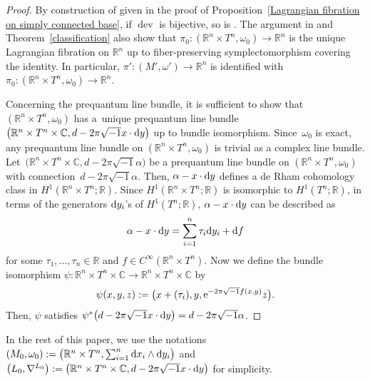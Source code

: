\documentclass[10pt,a4paper]{amsart}
\numberwithin{equation}{section}
\newcommand{\C}{\mathbb{C}}
\newcommand{\R}{\mathbb{R}}
\renewcommand{\tilde}{\widetilde}
\def\dev{\operatorname{dev}}
\begin{document}
\begin{proof}
By construction of \smash{$\tilde \dev$} given in the proof of Proposition~\ref{Lagrangian fibration on simply connected base}, if $\dev$ is bijective, so is \smash{$\tilde \dev$}. The argument in \cite[p.\ 696]{Du} and Theorem~\ref{classification} also show that $\pi_0\colon (\R^n\times T^n,\omega_0)\to \R^n$ is the unique Lagrangian fibration on $\R^n$ up to fiber-preserving symplectomorphism covering the identity. In particular, $\pi'\colon (M',\omega')\to \R^n$ is identified with $\pi_0\colon (\R^n\times T^n,\omega_0)\to \R^n$.

Concerning the prequantum line bundle, it is sufficient to show that $(\R^n\times T^n,\omega_0)$ has a~unique prequantum line bundle $\bigl(\R^n\times T^n\times \C , d-2\pi\sqrt{-1}x\cdot {\rm d}y\bigr)$ up to bundle isomorphism. Since~$\omega_0$ is exact, any prequantum line bundle on $(\R^n\times T^n,\omega_0)$ is trivial as a complex line bundle. Let~${\bigl(\R^n\times T^n\times \C ,d-2\pi\sqrt{-1}\alpha\bigr)}$ be a prequantum line bundle on $(\R^n\times T^n,\omega_0)$ with connection~${d-2\pi\sqrt{-1}\alpha}$. Then, $\alpha-x\cdot {\rm d}y$ defines a de Rham cohomology class in $H^1(\R^n\times T^n; \R)$. Since $H^1(\R^n\times T^n; \R)$ is isomorphic to $H^1(T^n;\R)$, in terms of the generators ${\rm d}y_i$'s of $H^1(T^n;\R)$, $\alpha-x\cdot {\rm d}y$ can be described as
\[
\alpha-x\cdot {\rm d}y=\sum_{i=1}^n\tau_i{\rm d}y_i+{\rm d}f
\]
for some $\tau_1,\ldots ,\tau_n\in \R$ and $f\in C^\infty(\R^n\times T^n)$. Now we define the bundle isomorphism $\psi\colon \R^n\times T^n\times \C \to \R^n\times T^n\times \C$ by
\[
\psi(x,y,z):=\bigl(x+(\tau_i),y,{\rm e}^{-2\pi\sqrt{-1}f(x,y)}z\bigr) .
\]
Then, $\psi$ satisfies $\psi^*\bigl(d-2\pi\sqrt{-1}x\cdot {\rm d}y\bigr)=d-2\pi\sqrt{-1}\alpha$.
\end{proof}


In the rest of this paper, we use the notations $(M_0, \omega_0):=\bigl( \R^n\times T^n, \sum_{i=1}^n{\rm d}x_i\wedge {\rm d}y_i\bigr)$ and~${\bigl( L_0, \nabla^{L_0}\bigr):=\bigl(\R^n\times T^n\times \C , d-2\pi\sqrt{-1}x\cdot {\rm d}y\bigr)}$ for simplicity.
\end{document}
